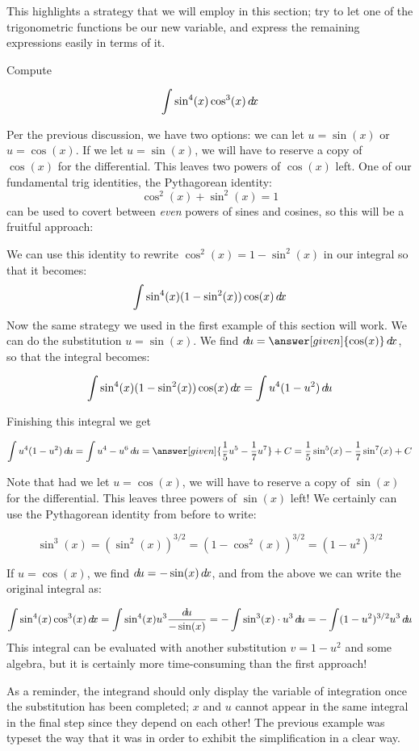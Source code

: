 \documentclass{ximera}
\begin{document}
This highlights a strategy that we will employ in this section; try to let one of the trigonometric functions be our new variable, and express the remaining expressions easily in terms of it.

\begin{example}
Compute

\[ 
\int \sin^{4}(x) \cos^{3}(x) \mathop{}\!d\! x 
\]

\begin{explanation}
Per the previous discussion, we have two options: we can let $u= \sin(x)$ or $u=\cos(x)$.  
If we let $u = \sin(x)$, we will have to reserve a copy of $\cos(x)$ for the differential. This leaves two powers of $\cos(x)$ left.   One of our fundamental trig identities, the Pythagorean identity:
\[
\cos^{2}(x) + \sin^{2}(x)=1
\]
can be used to covert between \emph{even} powers of sines and cosines, so this will be a fruitful approach:

We can use this identity to rewrite $\cos^{2}(x)=1-\sin^{2}(x)$ in our integral so that it becomes:
\[
\int \sin^{4}(x) (1-\sin^{2}(x)) \cos(x) \mathop{}\!d\! x
\]
Now the same strategy we used in the first example of this section will work. We can do the substitution $u=\sin(x)$. We find $\d u= \answer[given]{\cos(x)} \d x$, so that the integral becomes:

\[ 
\int \sin^{4}(x) (1-\sin^{2}(x)) \cos(x) \mathop{}\!d\! x =  \int u^{4}(1-u^{2}) \mathop{}\!d\! u
\]

Finishing this integral we get 

\[ 
\int u^{4}(1-u^{2}) \d u= \int u^{4}-u^{6} \d u = \answer[given]{\frac{1}{5}u^5 - \frac{1}{7}u^7} + C =\frac{1}{5}\sin^{5}(x) - \frac{1}{7} \sin^{7}(x) + C
\]

Note that had we let $u = \cos(x)$, we will have to reserve a copy of $\sin(x)$ for the differential. This leaves three powers of $\sin(x)$ left! We certainly can use the Pythagorean identity from before to write:

\[ \sin^3(x) = \left(\sin^2(x)\right)^{3/2} = \left(1-\cos^2(x)\right)^{3/2} = (1-u^2)^{3/2} \]

If $u = \cos(x)$, we find $\mathop{}\!d\! u = -\sin(x) \mathop{}\!d\! x$, and from the above we can write the original integral as:

\[ 
\int \sin^{4}(x) \cos^{3}(x) \d x = \int \sin^4(x) u^3 \frac{\d u}{-\sin(x)} = -\int \sin^3(x) \cdot u^3 \d u = -\int (1-u^2)^{3/2} u^3 \d u
\]
This integral can be evaluated with another substitution $v = 1-u^2$ and some algebra, but it is certainly more time-consuming than the first approach!

\end{explanation}

\begin{remark}
As a reminder, the integrand should only display the variable of integration once the substitution has been completed; $x$ and $u$ cannot appear in the same integral in the final step since they depend on each other!  The previous example was typeset the way that it was in order to exhibit the simplification in a clear way.
\end{remark}
\end{example}
\end{document}
